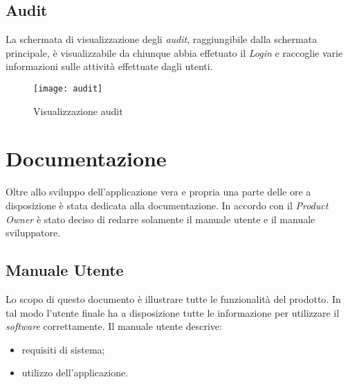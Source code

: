 \subsection{Audit}
La schermata di visualizzazione degli \textit{audit}, raggiungibile dalla schermata principale, è visualizzabile da chiunque abbia effetuato il \textit{Login} e raccoglie varie informazioni sulle attività effettuate dagli utenti.
\begin{figure}[h]
    \begin{center}
    \texttt{[image: audit]}
    \caption{Visualizzazione audit}
    \label{fig:figure30}
    \end{center}
\end{figure}

\section{Documentazione}
Oltre allo sviluppo dell'applicazione vera e propria una parte delle ore a disposizione è stata dedicata alla documentazione. In accordo con il \textit{Product Owner} è stato deciso di redarre solamente il manuale utente e il manuale sviluppatore.

\subsection{Manuale Utente}
Lo scopo di questo documento è illustrare tutte le funzionalità del prodotto. In tal modo l'utente finale ha a disposizione tutte le informazione per utilizzare il \textit{software} correttamente.
Il manuale utente descrive:
\begin{itemize}
    \item requisiti di sistema;
    \item utilizzo dell'applicazione.
\end{itemize}

